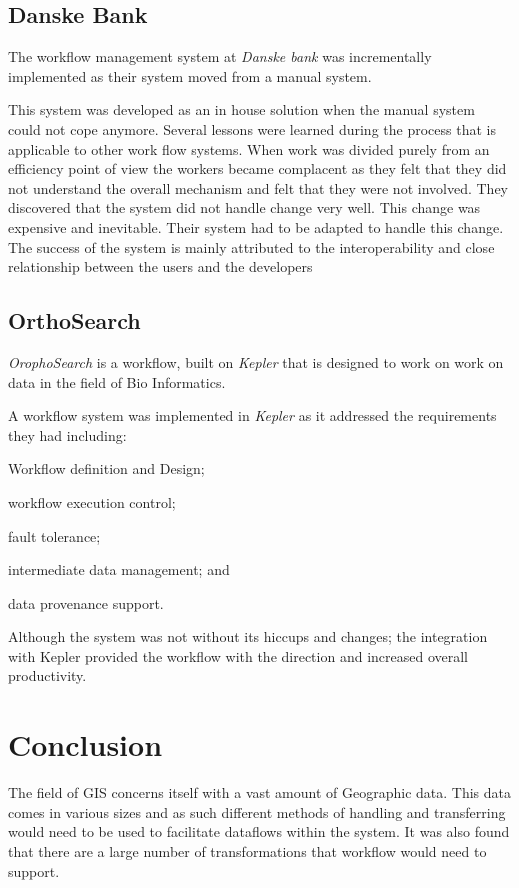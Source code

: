 \documentclass[11pt,twocolumn]{article}
\begin{document}
    \subsection*{Danske Bank}
      The workflow management system at \emph{Danske bank} was
      incrementally implemented as their system moved
      from a manual system.\cite{Brahe:2007:SWW:1316624.1316661}

      This system was developed as an in house solution when
      the manual system could not cope anymore.
      Several lessons were learned during the process that
      is applicable to other work flow systems. When work
      was divided purely from an efficiency point of view
      the workers became complacent as they felt that they
      did not understand the overall mechanism and felt that
      they were not involved. They discovered that the
      system did not handle change very well. This change
      was expensive and inevitable. Their system had
      to be adapted to handle this change. The success of the
      system is mainly attributed to the interoperability and
      close relationship between the users and the developers

    \subsection*{OrthoSearch}
      \emph{OrophoSearch} is a workflow,
      built on \emph{Kepler} that is designed to work on
      work on data in the field of Bio Informatics.
      \cite{daCruz:2008:OSW:1363686.1363983}

      A workflow system was implemented in \emph{Kepler}
      as it addressed the requirements they had
      including: \begin{inparaenum}[(i)]
      \item Workflow definition and Design; \item workflow execution
      control; \item fault tolerance; \item intermediate
      data management; and \item data provenance support.
      \end{inparaenum}

      Although the system was not without its hiccups and changes;
      the integration with Kepler provided the workflow with the
      direction and increased overall productivity.


\section{Conclusion}
   The field of GIS concerns itself with a vast amount of Geographic
   data. This data comes in various sizes and as such different
   methods of handling and transferring would need to be used to
   facilitate dataflows within the system. It was also found that
   there are a large number of transformations that workflow would
   need to support.
\end{document}
